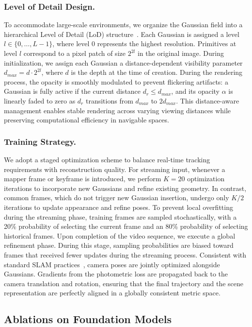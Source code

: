 \subsubsection{Level of Detail Design.} To accommodate large-scale environments, we organize the Gaussian field into a hierarchical Level of Detail (LoD) structure~\cite{artdeco}. Each Gaussian is assigned a level $l \in \{0, \dots, L-1\}$, where level 0 represents the highest resolution. Primitives at level $l$ correspond to a pixel patch of size $2^{2l}$ in the original image. During initialization, we assign each Gaussian a distance-dependent visibility parameter $d_{max} = d \cdot 2^{2l}$, where $d$ is the depth at the time of creation. During the rendering process, the opacity is smoothly modulated to prevent flickering artifacts: a Gaussian is fully active if the current distance $d_r \leq d_{max}$, and its opacity $\alpha$ is linearly faded to zero as $d_r$ transitions from $d_{max}$ to $2d_{max}$. This distance-aware management enables stable rendering across varying viewing distances while preserving computational efficiency in navigable spaces.

\subsubsection{Training Strategy.} We adopt a staged optimization scheme to balance real-time tracking requirements with reconstruction quality. For streaming input, whenever a mapper frame or keyframe is introduced, we perform $K=20$ optimization iterations to incorporate new Gaussians and refine existing geometry. In contrast, common frames, which do not trigger new Gaussian insertion, undergo only $K/2$ iterations to update appearance and refine poses. To prevent local overfitting during the streaming phase, training frames are sampled stochastically, with a 20\% probability of selecting the current frame and an 80\% probability of selecting historical frames.
Upon completion of the video sequence, we execute a global refinement phase. During this stage, sampling probabilities are biased toward frames that received fewer updates during the streaming process. Consistent with standard SLAM practices~\cite{matsuki2024gaussian}, camera poses are jointly optimized alongside Gaussians. Gradients from the photometric loss are propagated back to the camera translation and rotation, ensuring that the final trajectory and the scene representation are perfectly aligned in a globally consistent metric space.

\subsection{Ablations on Foundation Models}
\label{sec:ablation}

